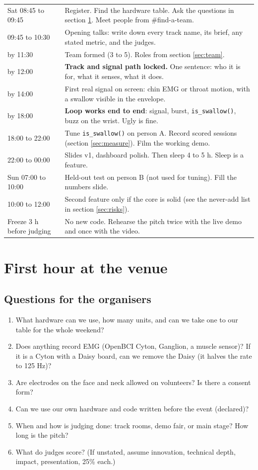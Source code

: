 \documentclass[10.5pt,a4paper]{article}
\newcommand{\f}[1]{\texttt{#1}}
\begin{document}
\begin{tabularx}{\linewidth}{@{}p{2.6cm}L@{}}
\toprule
Sat 08:45 to 09:45 & Register. Find the hardware table. Ask the questions in section \ref{sec:first}. Meet people from \#find-a-team.\\
09:45 to 10:30 & Opening talks: write down every track name, its brief, any stated metric, and the judges.\\
by 11:30 & Team formed (3 to 5). Roles from section \ref{sec:team}.\\
by 12:00 & \textbf{Track and signal path locked.} One sentence: who it is for, what it senses, what it does.\\
by 14:00 & First real signal on screen: chin EMG or throat motion, with a swallow visible in the envelope.\\
by 18:00 & \textbf{Loop works end to end}: signal, burst, \f{is\_swallow()}, buzz on the wrist. Ugly is fine.\\
18:00 to 22:00 & Tune \f{is\_swallow()} on person A. Record scored sessions (section \ref{sec:measure}). Film the working demo.\\
22:00 to 00:00 & Slides v1, dashboard polish. Then sleep 4 to 5 h. Sleep is a feature.\\
Sun 07:00 to 10:00 & Held-out test on person B (not used for tuning). Fill the numbers slide.\\
10:00 to 12:00 & Second feature only if the core is solid (see the never-add list in section \ref{sec:risks}).\\
Freeze 3 h before judging & No new code. Rehearse the pitch twice with the live demo and once with the video.\\
\bottomrule
\end{tabularx}

\section{First hour at the venue}\label{sec:first}
\subsection{Questions for the organisers}
\begin{enumerate}
\item What hardware can we use, how many units, and can we take one to our table for the whole weekend?
\item Does anything record EMG (OpenBCI Cyton, Ganglion, a muscle sensor)? If it is a Cyton with a Daisy board, can we remove the Daisy (it halves the rate to 125 Hz)?
\item Are electrodes on the face and neck allowed on volunteers? Is there a consent form?
\item Can we use our own hardware and code written before the event (declared)?
\item When and how is judging done: track rooms, demo fair, or main stage? How long is the pitch?
\item What do judges score? (If unstated, assume innovation, technical depth, impact, presentation, 25\% each.)
\end{enumerate}
\end{document}
